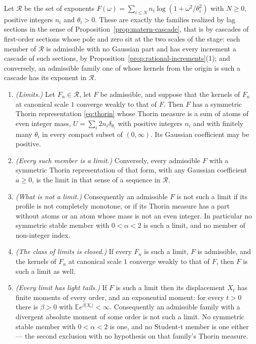 \begin{proposition}\label{prop:rational-closure}
Let $\mathcal{R}$ be the set of exponents
$F(\omega) = \sum_{i \le N} n_i\log(1 + \omega^2/\theta_i^2)$ with $N \ge 0$, positive integers
$n_i$ and $\theta_i > 0$. These are exactly the families realized by lag sections in the sense of
Proposition~\ref{prop:matern-cascade}, that is by cascades of first-order sections whose pole and
zero sit at the two scales of the stage: each member of $\mathcal{R}$ is admissible with no
Gaussian part and has every increment a cascade of such sections, by
Proposition~\ref{prop:rational-increments}(1); and conversely, an admissible family one of whose
kernels from the origin is such a cascade has its exponent in $\mathcal{R}$.
\begin{enumerate}
\item \emph{(Limits.)} Let $F_n \in \mathcal{R}$, let $F$ be admissible, and suppose that the
kernels of $F_n$ at canonical scale $1$ converge weakly to that of $F$. Then $F$ has a symmetric
Thorin representation \ref{eq:thorin} whose Thorin measure is a sum of atoms of even integer
mass, $U = \sum_i 2n_i\delta_{\theta_i}$ with positive integers $n_i$ and with finitely many
$\theta_i$ in every compact subset of $(0,\infty)$. Its Gaussian coefficient may be positive.
\item \emph{(Every such member is a limit.)} Conversely, every admissible $F$ with a symmetric
Thorin representation of that form, with any Gaussian coefficient $a \ge 0$, is the limit in
that sense of a sequence in $\mathcal{R}$.
\item \emph{(What is not a limit.)} Consequently an admissible $F$ is not such a limit if its
profile is not completely monotone, or if its Thorin measure has a part without atoms or an
atom whose mass is not an even integer. In particular no symmetric stable member with
$0 < \alpha < 2$ is such a limit, and no \Matern{} member of non-integer index.
\item \emph{(The class of limits is closed.)} If every $F_n$ is such a limit, $F$ is admissible,
and the kernels of $F_n$ at canonical scale $1$ converge weakly to that of $F$, then $F$ is such
a limit as well.
\item \emph{(Every limit has light tails.)} If $F$ is such a limit then its displacement $X_t$
has finite moments of every order, and an exponential moment: for every $t > 0$ there is
$\beta > 0$ with $\mathbb{E}e^{\beta|X_t|} < \infty$. Consequently an admissible family with a
divergent absolute moment of some order is not such a limit. No symmetric stable member with
$0 < \alpha < 2$ is one, and no Student-t member is one either --- the second exclusion with no
hypothesis on that family's Thorin measure.
\end{enumerate}
\end{proposition}

